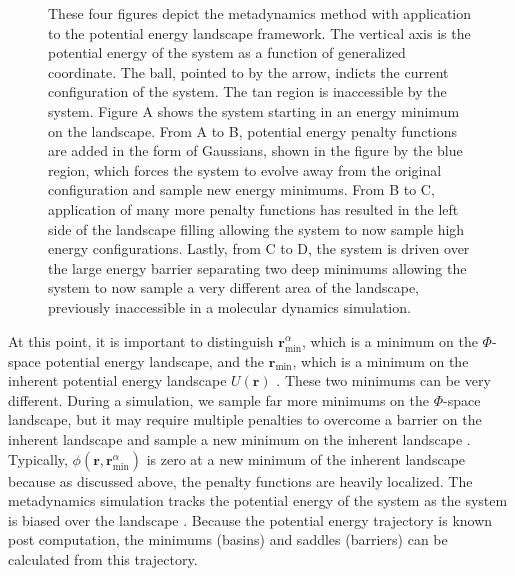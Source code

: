 \begin{figure}
	\caption{These four figures depict the metadynamics method with application to the potential energy landscape framework.  The vertical axis is the potential energy of the system as a function of generalized coordinate.  The ball, pointed to by the arrow, indicts the current configuration of the system.  The tan region is inaccessible by the system.  Figure A shows the system starting in an energy minimum on the landscape.  From A to B, potential energy penalty functions are added in the form of Gaussians, shown in the figure by the blue region, which forces the system to evolve away from the original configuration and sample new energy minimums.  From B to C, application of many more penalty functions has resulted in the left side of the landscape filling allowing the system to now sample high energy configurations.  Lastly, from C to D, the system is driven over the large energy barrier separating two deep minimums allowing the system to now sample a very different area of the landscape, previously inaccessible in a molecular dynamics simulation.}
	\label{landscape filling}
\end{figure}

At this point, it is important to distinguish $\mathbf{r}_{\min}^\alpha$, which is a minimum on the $\Phi$-space potential energy landscape, and the $\mathbf{r}_{\min}$, which is a minimum on the inherent potential energy landscape $U(\mathbf{r})$ \cite{Kushima2009, Kushima2009a}.  These two minimums can be very different.  During a simulation, we sample far more minimums on the $\Phi$-space landscape, but it may require multiple penalties to overcome a barrier on the inherent landscape and sample a new minimum on the inherent landscape \cite{Kushima2009, Kushima2009a}.  Typically, $\phi(\mathbf{r},\mathbf{r}_{\min}^\alpha)$ is zero at a new minimum of the inherent landscape because as discussed above, the penalty functions are heavily localized.  The metadynamics simulation tracks the potential energy of the system as the system is biased over the landscape \cite{Kushima2009, Kushima2009a}.  Because the potential energy trajectory is known post computation, the minimums (basins) and saddles (barriers) can be calculated from this trajectory. 


